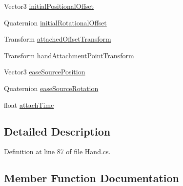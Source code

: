 \begin{DoxyCompactItemize}
\item 
Vector3 \mbox{\hyperlink{struct_valve_1_1_v_r_1_1_interaction_system_1_1_hand_1_1_attached_object_a04a62d67a30faefef21b8002084d9993}{initial\+Positional\+Offset}}
\item 
Quaternion \mbox{\hyperlink{struct_valve_1_1_v_r_1_1_interaction_system_1_1_hand_1_1_attached_object_a5aac2b7878ac5461702875eea85eef18}{initial\+Rotational\+Offset}}
\item 
Transform \mbox{\hyperlink{struct_valve_1_1_v_r_1_1_interaction_system_1_1_hand_1_1_attached_object_a0d8bbd9f31833ed7025632d2eb328df4}{attached\+Offset\+Transform}}
\item 
Transform \mbox{\hyperlink{struct_valve_1_1_v_r_1_1_interaction_system_1_1_hand_1_1_attached_object_abb1129be2bf1a9b785870f79388b6eab}{hand\+Attachment\+Point\+Transform}}
\item 
Vector3 \mbox{\hyperlink{struct_valve_1_1_v_r_1_1_interaction_system_1_1_hand_1_1_attached_object_a3cf2a7d8e10db0d3e49731c0679f246c}{ease\+Source\+Position}}
\item 
Quaternion \mbox{\hyperlink{struct_valve_1_1_v_r_1_1_interaction_system_1_1_hand_1_1_attached_object_aa1fb1caaf59d27239865a4b85491ac8f}{ease\+Source\+Rotation}}
\item 
float \mbox{\hyperlink{struct_valve_1_1_v_r_1_1_interaction_system_1_1_hand_1_1_attached_object_a0e64fb6f2b092b2a16de70e5cf5e09ba}{attach\+Time}}
\end{DoxyCompactItemize}


\subsection{Detailed Description}


Definition at line 87 of file Hand.\+cs.



\subsection{Member Function Documentation}
\mbox{\label{struct_valve_1_1_v_r_1_1_interaction_system_1_1_hand_1_1_attached_object_a67a2704780f26b5e61c638aedf8c3d41}} 
